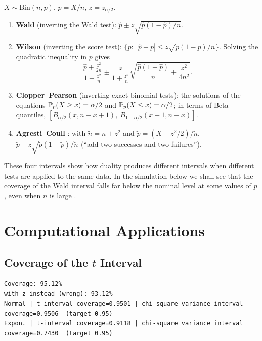 \documentclass[main.tex]{subfiles}
\begin{document}
\begin{example}\label{ex:binom-ci}
$X\sim\text{Bin}(n,p)$, $\hat p=X/n$, $z=z_{\alpha/2}$.
\begin{enumerate}
  \item \textbf{Wald} (inverting the Wald test): $\hat p\pm z\sqrt{\hat p(1-\hat p)/n}$.
  \item \textbf{Wilson} \cite{wilson27} (inverting the score test): $\{p:\ |\hat p-p|\le z\sqrt{p(1-p)/n}\}$. Solving the quadratic inequality in $p$ gives
  \[
  \frac{\hat p+\frac{z^2}{2n}}{1+\frac{z^2}{n}}\pm\frac{z}{1+\frac{z^2}{n}}\sqrt{\frac{\hat p(1-\hat p)}{n}+\frac{z^2}{4n^2}}.
  \]
  \item \textbf{Clopper--Pearson} \cite{clopper34} (inverting exact binomial tests): the solutions of the equations $\P_p(X\ge x)=\alpha/2$ and $\P_p(X\le x)=\alpha/2$; in terms of Beta quantiles, $[B_{\alpha/2}(x,n-x+1),\ B_{1-\alpha/2}(x+1,n-x)]$.
  \item \textbf{Agresti--Coull} \cite{agresti98}: with $\tilde n=n+z^2$ and $\tilde p=(X+z^2/2)/\tilde n$, $\tilde p\pm z\sqrt{\tilde p(1-\tilde p)/\tilde n}$ (``add two successes and two failures'').
\end{enumerate}
These four intervals show how duality produces different intervals when different tests are applied to the same data. In the simulation below we shall see that the coverage of the Wald interval falls far below the nominal level at some values of $p$, even when $n$ is large \cite{brown-cai}.
\end{example}

\section{Computational Applications}

\subsection{Coverage of the $t$ Interval}

\begin{lstlisting}[style=output]
Coverage: 95.12%
with z instead (wrong): 93.12%
Normal | t-interval coverage=0.9501 | chi-square variance interval coverage=0.9506  (target 0.95)
Expon. | t-interval coverage=0.9118 | chi-square variance interval coverage=0.7430  (target 0.95)
\end{lstlisting}
\end{document}
